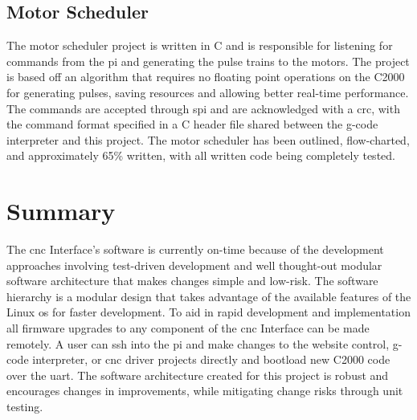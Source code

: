 \subsection{Motor Scheduler}
The motor scheduler project is written in C and is responsible for listening for commands from the \gls{pi} and generating the pulse trains to the motors.
The project is based off an algorithm that requires no floating point operations on the C2000 for generating pulses, saving resources and allowing better real-time performance.
The commands are accepted through \gls{spi} and are acknowledged with a \gls{crc}, with the command format specified in a C header file shared between the g-code interpreter and this project.
The motor scheduler has been outlined, flow-charted, and approximately 65\% written, with all written code being completely tested.

\section{Summary}
The \gls{cnc} Interface's software is currently on-time because of the development approaches involving test-driven development and well thought-out modular software architecture that makes changes simple and low-risk.
The software hierarchy is a modular design that takes advantage of the available features of the Linux \gls{os} for faster development.
To aid in rapid development and implementation all firmware upgrades to any component of the \gls{cnc} Interface can be made remotely.
A user can \gls{ssh} into the \gls{pi} and make changes to the website control, g-code interpreter, or \gls{cnc} driver projects directly and bootload new C2000 code over the \gls{uart}.
The software architecture created for this project is robust and encourages changes in improvements, while mitigating change risks through unit testing.
